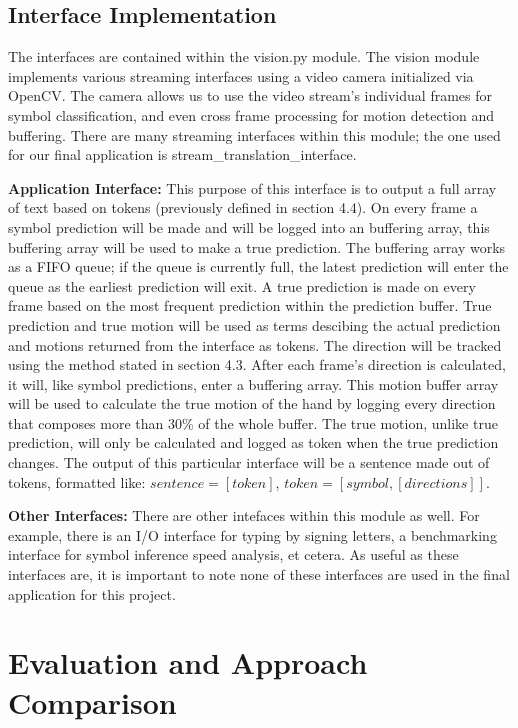 \documentclass[11pt]{article}
\def\paraskip{\vskip 0.4cm}
\begin{document}
    \subsection{Interface Implementation}
    The interfaces are contained within the vision.py module. The vision module implements various streaming interfaces using a video camera initialized via OpenCV. The camera allows us to use the video stream's individual frames for symbol classification, and even cross frame processing for motion detection and buffering. There are many streaming interfaces within this module; the one used for our final application is stream\_translation\_interface. 

    \paraskip
    \noindent\textbf{Application Interface: } This purpose of this interface is to output a full array of text based on tokens (previously defined in section 4.4). On every frame a symbol prediction will be made and will be logged into an buffering array, this buffering array will be used to make a true prediction. The buffering array works as a FIFO queue; if the queue is currently full, the latest prediction will enter the queue as the earliest prediction will exit. A true prediction is made on every frame based on the most frequent prediction within the prediction buffer. True prediction and true motion will be used as terms descibing the actual prediction and motions returned from the interface as tokens. The direction will be tracked using the method stated in section 4.3. After each frame's direction is calculated, it will, like symbol predictions, enter a buffering array. This motion buffer array will be used to calculate the true motion of the hand by logging every direction that composes more than 30\% of the whole buffer. The true motion, unlike true prediction, will only be calculated and logged as token when the true prediction changes. The output of this particular interface will be a sentence made out of tokens, formatted like: $sentence = [token]$, $token = [symbol, [directions]]$.

    \paraskip
    \noindent\textbf{Other Interfaces: } There are other intefaces within this module as well. For example, there is an I/O interface for typing by signing letters, a benchmarking interface for symbol inference speed analysis, et cetera. As useful as these interfaces are, it is important to note none of these interfaces are used in the final application for this project.


\section{Evaluation and Approach Comparison}
\end{document}
